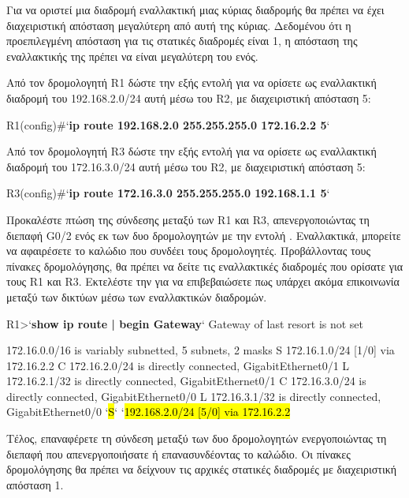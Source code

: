 \documentclass{EdipyLabs} %
\begin{document}
Για να οριστεί μια διαδρομή εναλλακτική μιας κύριας διαδρομής θα πρέπει να έχει διαχειριστική απόσταση μεγαλύτερη από αυτή της κύριας. Δεδομένου ότι η προεπιλεγμένη απόσταση για τις στατικές διαδρομές είναι 1, η απόσταση της εναλλακτικής της πρέπει να είναι μεγαλύτερη του ενός. 

Από τον δρομολογητή R1 δώστε την εξής εντολή για να ορίσετε ως εναλλακτική διαδρομή του 192.168.2.0/24 αυτή μέσω του R2, με διαχειριστική απόσταση 5:

\begin{CommandBox}
R1(config)#`\textbf{ip route 192.168.2.0 255.255.255.0 172.16.2.2 5}`
\end{CommandBox}

Από τον δρομολογητή R3 δώστε την εξής εντολή για να ορίσετε ως εναλλακτική διαδρομή του 172.16.3.0/24 αυτή μέσω του R2, με διαχειριστική απόσταση 5:

\begin{CommandBox}
R3(config)#`\textbf{ip route 172.16.3.0 255.255.255.0 192.168.1.1 5}`
\end{CommandBox}

Προκαλέστε πτώση της σύνδεσης μεταξύ των R1 και R3, απενεργοποιώντας τη διεπαφή G0/2 ενός εκ των δυο δρομολογητών με την εντολή . Εναλλακτικά, μπορείτε να αφαιρέσετε το καλώδιο που συνδέει τους δρομολογητές. Προβάλλοντας τους πίνακες δρομολόγησης, θα πρέπει να δείτε τις εναλλακτικές διαδρομές που ορίσατε για τους R1 και R3. Εκτελέστε την  για να επιβεβαιώσετε πως υπάρχει ακόμα επικοινωνία μεταξύ των δικτύων μέσω των εναλλακτικών διαδρομών.

\begin{CommandBox}
R1>`\textbf{show ip route | begin Gateway}`
Gateway of last resort is not set
	
     172.16.0.0/16 is variably subnetted, 5 subnets, 2 masks
S       172.16.1.0/24 [1/0] via 172.16.2.2
C       172.16.2.0/24 is directly connected, GigabitEthernet0/1
L       172.16.2.1/32 is directly connected, GigabitEthernet0/1
C       172.16.3.0/24 is directly connected, GigabitEthernet0/0
L       172.16.3.1/32 is directly connected, GigabitEthernet0/0
`\hl{S}`       `\hl{192.168.2.0/24 [5/0] via 172.16.2.2}
\end{CommandBox}

Τέλος, επαναφέρετε τη σύνδεση μεταξύ των δυο δρομολογητών ενεργοποιώντας τη διεπαφή που απενεργοποιήσατε ή επανασυνδέοντας το καλώδιο. Οι πίνακες δρομολόγησης θα πρέπει να δείχνουν τις αρχικές στατικές διαδρομές με διαχειριστική απόσταση 1.
\end{document}
